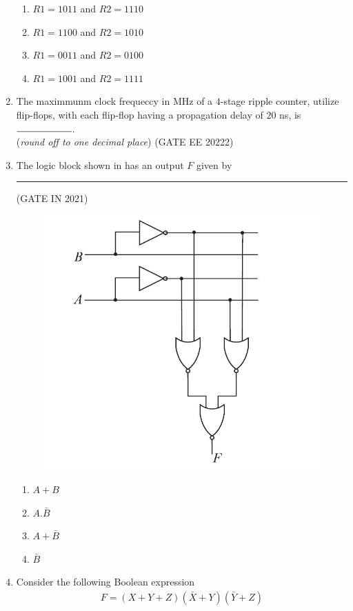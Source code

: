 \begin{enumerate}[label=\arabic*.,ref=\theenumi]
    \begin{enumerate}
        \item $R1 = 1011$ and $R2 = 1110$
        \item $R1 = 1100$ and $R2 = 1010$
        \item $R1 = 0011$ and $R2 = 0100$
        \item $R1 = 1001$ and $R2 = 1111$
    \end{enumerate}


\item The maximmunm clock frequeccy in MHz of a $4$-stage ripple counter, utilize flip-flops, with each flip-flop having a propagation delay of $20$ ns, is $\rule{2cm}{0.15mm}$.\\
(\textit{round off to one decimal place})
\hfill{(GATE EE 20222)}

\item The logic block shown 
in
	has an output $F$ given by \rule{2cm}{0.15mm}
\hfill (GATE IN 2021)
\begin{figure}[H]
\centering
\includegraphics[width=0.75\columnwidth]{figs/gatemage.jpg}
	\caption{}
\label{fig:GATE IN 2021}
\end{figure}
\begin{enumerate}
	\item$A+B$
	\item$A.\bar{B}$
	\item$A+\bar{B}$
	\item$\bar{B}$
\end{enumerate}

\item Consider the following Boolean expression 
\begin{align*} F = (X+Y+Z)(\bar{X}+Y)(\bar{Y}+Z) \end{align*}
       

\end{enumerate}
